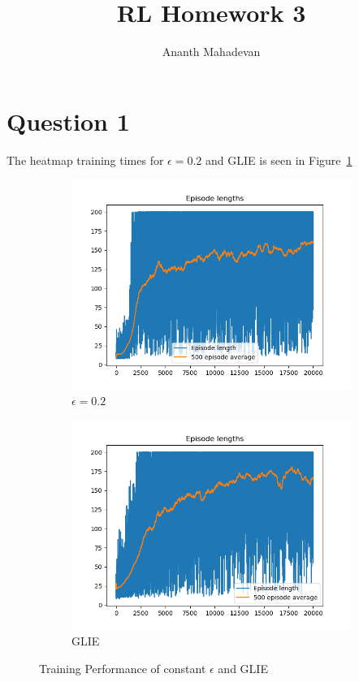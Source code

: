 \documentclass[a4paper]{article}
\title{RL Homework 3}
\author{Ananth Mahadevan}
\begin{document}
\maketitle
\clearpage
\tableofcontents
\clearpage

\section{Question 1}
The heatmap training times for $\epsilon=0.2$ and GLIE is seen in Figure~\ref{fig-training-cartpole}

\begin{figure}[h!]
    \centering
    \begin{subfigure}[b]{0.4\textwidth}
        \centering
        \includegraphics[width=\textwidth]{training_epsilon_0_2.png}
        \caption{$\epsilon=0.2$}
    \end{subfigure}
    \begin{subfigure}[b]{0.4\textwidth}
        \centering
        \includegraphics[width=\textwidth]{training_GLIE.png}
        \caption{GLIE}
    \end{subfigure}
    \caption{Training Performance of constant $\epsilon$ and GLIE }
    \label{fig-training-cartpole}
\end{figure}
\end{document}
